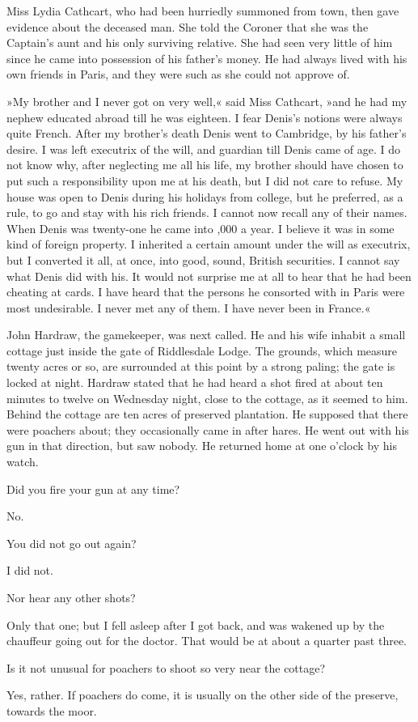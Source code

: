 Miss Lydia Cathcart, who had been hurriedly summoned from town, then gave evidence about the deceased man. She told the Coroner that she was the Captain's aunt and his only surviving relative. She had seen very little of him since he came into possession of his father's money. He had always lived with his own friends in Paris, and they were such as she could not approve of.

»My brother and I never got on very well,« said Miss Cathcart, »and he had my nephew educated abroad till he was eighteen. I fear Denis's notions were always quite French. After my brother's death Denis went to Cambridge, by his father's desire. I was left executrix of the will, and guardian till Denis came of age. I do not know why, after neglecting me all his life, my brother should have chosen to put such a responsibility upon me at his death, but I did not care to refuse.  My house was open to Denis during his holidays from college, but he preferred, as a rule, to go and stay with his rich friends. I cannot now recall any of their names. When Denis was twenty-one he came into ,000 a year. I believe it was in some kind of foreign property. I inherited a certain amount under the will as executrix, but I converted it all, at once, into good, sound, British securities. I cannot say what Denis did with his. It would not surprise me at all to hear that he had been cheating at cards. I have heard that the persons he consorted with in Paris were most undesirable. I never met any of them.  I have never been in France.«

John Hardraw, the gamekeeper, was next called. He and his wife inhabit a small cottage just inside the gate of Riddlesdale Lodge. The grounds, which measure twenty acres or so, are surrounded at this point by a strong paling; the gate is locked at night. Hardraw stated that he had heard a shot fired at about ten minutes to twelve on Wednesday night, close to the cottage, as it seemed to him. Behind the cottage are ten acres of preserved plantation. He supposed that there were poachers about; they occasionally came in after hares. He went out with his gun in that direction, but saw nobody. He returned home at one o'clock by his watch.

\begin{dialogue}

 Did you fire your gun at any time?

 No.

 You did not go out again?

 I did not.

 Nor hear any other shots?

 Only that one; but I fell asleep after I got back, and was wakened up by the chauffeur going out for the doctor. That would be at about a quarter past three.

 Is it not unusual for poachers to shoot so very near the cottage?

 Yes, rather. If poachers do come, it is usually on the other side of the preserve, towards the moor.
\end{dialogue}

